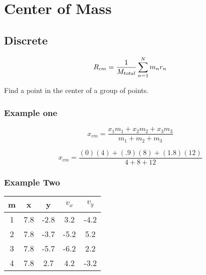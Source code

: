\documentclass{article}
\begin{document}
    \section{Center of Mass}
        \subsection{Discrete}
        \begin{equation}
            \large
            R_{cm} = \frac{1}{M_{total}} \sum_{n=1}^{N} m_n r_n
        \end{equation}
        \hfil

        Find a point in the center of a group of points. 

        \subsubsection{Example one}
        \begin{center}
        \end{center}
        \[\boxed{x_{cm} = \frac{x_1m_1 + x_2m_2+ x_3m_3 }{m_1+ m_2 + m_3}}\]

        \[\boxed{x_{cm} = \frac{(0)(4) + (.9)(8) + (1.8)(12) }{4 + 8 + 12}}\]
        

        \subsubsection{Example Two}
            \begin{center}
                \begin{tabular}{|| c c c c c ||}
                    \hline
                    m & x & y & $v_x$ & $v_y$  \\ 
                    \hline
                    1 & 7.8 & -2.8 & 3.2 & -4.2 \\  
                    2 & 7.8 & -3.7  & -5.2 &  5.2 \\
                    3 & 7.8 & -5.7  & -6.2 &  2.2 \\ 
                    4 & 7.8 & 2.7  & 4.2 & -3.2 \\
                    \hline
                \end{tabular}
            \end{center}
        
\end{document}
